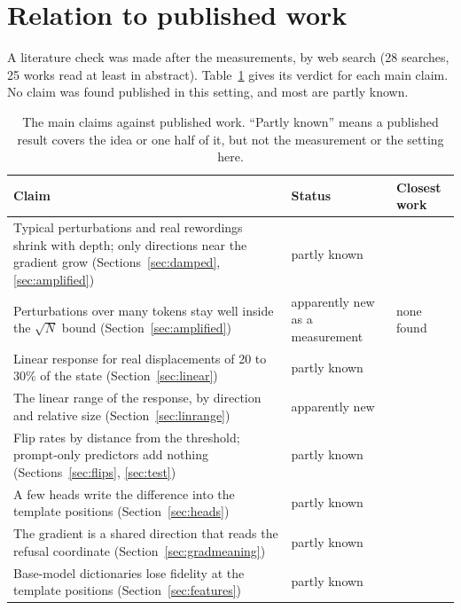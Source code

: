 \documentclass[11pt]{article}
\begin{document}
\section{Relation to published work}
\label{sec:related}

A literature check was made after the measurements, by web search (28 searches, 25 works read at least in abstract). Table~\ref{tab:related} gives its verdict for each main claim. No claim was found published in this setting, and most are partly known.

\begin{table}[ht]
\centering
\caption{The main claims against published work. ``Partly known'' means a published result covers the idea or one half of it, but not the measurement or the setting here.}
\label{tab:related}
\small
\begin{tabular}{p{}p{}p{}}
\toprule
Claim & Status & Closest work \\
\midrule
Typical perturbations and real rewordings shrink with depth; only directions near the gradient grow (Sections~\ref{sec:damped}, \ref{sec:amplified}) & partly known & \cite{goodfellow,fawzi,janiak} \\[4pt]
Perturbations over many tokens stay well inside the $\sqrt N$ bound (Section~\ref{sec:amplified}) & apparently new as a measurement & none found \\[4pt]
Linear response for real displacements of 20 to 30\% of the state (Section~\ref{sec:linear}) & partly known & \cite{kramar} \\[4pt]
The linear range of the response, by direction and relative size (Section~\ref{sec:linrange}) & apparently new & \cite{janiak} \\[4pt]
Flip rates by distance from the threshold; prompt-only predictors add nothing (Sections~\ref{sec:flips}, \ref{sec:test}) & partly known & \cite{salinas,hughes,anonto} \\[4pt]
A few heads write the difference into the template positions (Section~\ref{sec:heads}) & partly known & \cite{arditi,bentov,zhou,leong} \\[4pt]
The gradient is a shared direction that reads the refusal coordinate (Section~\ref{sec:gradmeaning}) & partly known & \cite{wollschlager,park} \\[4pt]
Base-model dictionaries lose fidelity at the template positions (Section~\ref{sec:features}) & partly known & \cite{gemmascope,kissane,minder,yeo} \\
\bottomrule
\end{tabular}
\end{table}
\end{document}
